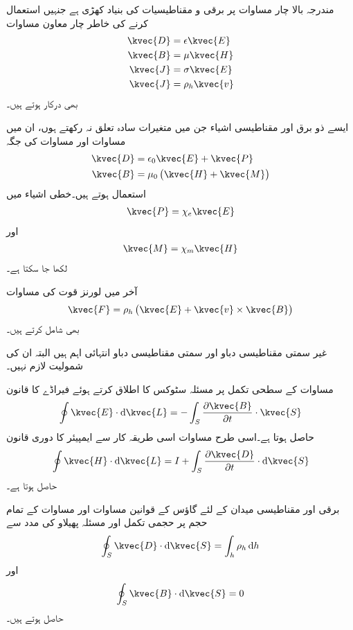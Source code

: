مندرجہ بالا چار مساوات پر برقی و مقناطیسیات کی بنیاد کھڑی ہے جنہیں استعمال کرنے کی خاطر چار معاون مساوات
\begin{align}
\kvec{D}&=\epsilon \kvec{E} \label{مساوات_میکس_ویل_خالی_خلاء_برقی_مستقل}\\
\kvec{B}&=\mu \kvec{H} \label{مساوات_میکس_ویل_خالی_خلاء_مقناطیسی_مستقل}\\
\kvec{J}&=\sigma \kvec{E}\\
\kvec{J}&=\rho_h \kvec{v}
\end{align}
بھی درکار ہوتے ہیں۔

ایسے ذو برق اور مقناطیسی اشیاء جن میں متغیرات سادہ تعلق نہ رکھتے ہوں، ان میں مساوات  اور مساوات  کی جگہ
\begin{align}
\kvec{D}&=\epsilon_0 \kvec{E}+\kvec{P}\\
\kvec{B}&=\mu_0 \left(\kvec{H}+\kvec{M} \right)
\end{align}
استعمال ہوتے ہیں۔خطی اشیاء میں
\begin{align}
\kvec{P}=\chi_e \kvec{E}
\end{align}
اور
\begin{align}
\kvec{M}=\chi_m \kvec{H}
\end{align}
لکھا جا سکتا ہے۔

آخر میں لورنز قوت کی مساوات 
\begin{align}
\kvec{F}=\rho_h \left(\kvec{E}+\kvec{v} \times \kvec{B} \right)
\end{align}
بھی شامل کرتے ہیں۔

غیر سمتی مقناطیسی دباو  اور سمتی مقناطیسی دباو  انتہائی اہم ہیں البتہ ان کی شمولیت لازم نہیں۔

 مساوات  کے سطحی تکمل پر مسئلہ سٹوکس کا اطلاق کرتے ہوئے فیراڈے کا قانون
\begin{align}\label{مساوات_میکس_ویل_تکمل_مساوات_الف}
\oint \kvec{E} \cdot \dif \kvec{L}=-\int_S \frac{\partial \kvec{B}}{\partial t} \cdot \kvec{S}
\end{align}
حاصل ہوتا ہے۔اسی طرح مساوات  اسی طریقہ کار سے ایمپیئر کا دوری قانون
\begin{align}\label{مساوات_میکس_ویل_تکمل_مساوات_ب}
\oint \kvec{H} \cdot \dif \kvec{L}=I+\int_S \frac{\partial \kvec{D}}{\partial t} \cdot \dif \kvec{S}
\end{align}
حاصل ہوتا ہے۔

برقی اور مقناطیسی میدان کے لئے گاؤس کے قوانین مساوات  اور مساوات  کے تمام حجم پر حجمی تکمل اور مسئلہ پھیلاو کی مدد سے 
\begin{align}\label{مساوات_میکس_ویل_تکمل_مساوات_پ}
\oint_S \kvec{D} \cdot \dif \kvec{S}=\int_h \rho_h \dif h
\end{align}
اور
\begin{align}\label{مساوات_میکس_ویل_تکمل_مساوات_ت}
\oint_S \kvec{B} \cdot \dif \kvec{S}=0
\end{align}
حاصل ہوتے ہیں۔

